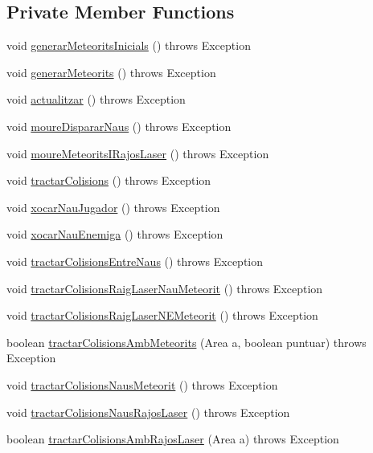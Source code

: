 \subsection*{Private Member Functions}
\begin{DoxyCompactItemize}
\item 
void \hyperlink{class_joc_ab4169a454c9b3b6b6030fd785483a15d}{generar\+Meteorits\+Inicials} ()  throws Exception 
\item 
void \hyperlink{class_joc_afb711913c78395c05839c3f775792beb}{generar\+Meteorits} ()  throws Exception 
\item 
void \hyperlink{class_joc_aafe85787281ae19be9ee44aabc5c116c}{actualitzar} ()  throws Exception 
\item 
void \hyperlink{class_joc_a5e56bca64b024955afe5269cbc79ca79}{moure\+Disparar\+Naus} ()  throws Exception 
\item 
void \hyperlink{class_joc_af9e0ddcc5b82db8ff4d07bbd443c7f8d}{moure\+Meteorits\+I\+Rajos\+Laser} ()  throws Exception 
\item 
void \hyperlink{class_joc_a1be330c10f1e2ee06f696e0a0bdec7c7}{tractar\+Colisions} ()  throws Exception 
\item 
void \hyperlink{class_joc_a471c58ad94b7a8732a6b3e4695f2a691}{xocar\+Nau\+Jugador} ()  throws Exception 
\item 
void \hyperlink{class_joc_a84da80994a7dd370b3772cf962500617}{xocar\+Nau\+Enemiga} ()  throws Exception 
\item 
void \hyperlink{class_joc_abc5db47ede50ddeccb50b2872d05cb6c}{tractar\+Colisions\+Entre\+Naus} ()  throws Exception 
\item 
void \hyperlink{class_joc_a9a3116242cc69985726f4825be70a9b5}{tractar\+Colisions\+Raig\+Laser\+Nau\+Meteorit} ()  throws Exception 
\item 
void \hyperlink{class_joc_af717aa44d1134343a67fc08374c3af45}{tractar\+Colisions\+Raig\+Laser\+N\+E\+Meteorit} ()  throws Exception 
\item 
boolean \hyperlink{class_joc_a16b0be1ee6298106946df8150044f667}{tractar\+Colisions\+Amb\+Meteorits} (Area a, boolean puntuar)  throws Exception 
\item 
void \hyperlink{class_joc_acf31c665e8f734f15f40f8e6792e8bba}{tractar\+Colisions\+Naus\+Meteorit} ()  throws Exception 
\item 
void \hyperlink{class_joc_a9ccc5adec1e7efdd6c01ba393d3686c6}{tractar\+Colisions\+Naus\+Rajos\+Laser} ()  throws Exception 
\item 
boolean \hyperlink{class_joc_ac94f4a327797f506171f0db74b3feaee}{tractar\+Colisions\+Amb\+Rajos\+Laser} (Area a)  throws Exception 
\end{DoxyCompactItemize}


